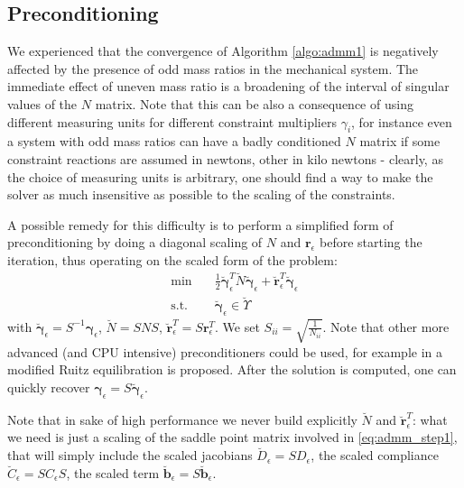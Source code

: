 \documentclass[final,3p]{elsarticle}
\newcommand{\vect}[1]{\bm{#1}}
\begin{document}
\subsection{Preconditioning}

We experienced that the convergence of Algorithm \ref{algo:admm1} is negatively affected by the presence of odd mass ratios in the mechanical system. The immediate effect of uneven mass ratio is a broadening of the interval of singular values of the $N$ matrix. Note that this can be also a consequence of using different measuring units for different constraint multipliers $\gamma_i$, for instance even a system with odd mass ratios can have a badly conditioned $N$ matrix if some constraint reactions are assumed in newtons, other in kilo newtons - clearly, as the choice of measuring units is arbitrary, one should find a way to make the solver as much insensitive as possible to the scaling of the constraints. 

A possible remedy for this difficulty is to perform a simplified form of preconditioning by doing a diagonal scaling of $N$ and $\vect{r}_\epsilon$ before starting the iteration, thus operating on the scaled form of the problem:
%
\begin{align}
	\text{min} \quad & \frac{1}{2} \breve{\vect{\gamma}}_\epsilon^T \breve{N} \breve{\vect{\gamma}}_\epsilon + \breve{\vect{r}}^T_\epsilon \breve{\vect{\gamma}}_\epsilon \\
	\text{s.t.} \quad & \breve{\vect{\gamma}}_\epsilon \in \breve{\Upsilon} 
	\label{eq:ChronoCCP_min_scaled}
\end{align}
%
with $\breve{\vect{\gamma}}_\epsilon = S^{-1} \vect{\gamma}_\epsilon$, $\breve{N} = S N S$, 
$\breve{\vect{r}}^T_\epsilon = S \vect{r}^T_\epsilon$. 
We set $S_{ii} = \sqrt{\frac{1}{N_{ii}}}$. 
Note that other more advanced (and CPU intensive) preconditioners could be used, for example in \cite{Stellato2020} a modified Ruitz equilibration is proposed.  
After the solution is computed, one can quickly recover $\vect{\gamma}_\epsilon = S \breve{\vect{\gamma}}_\epsilon$. 

Note that in sake of high performance we never build explicitly $\breve{N}$ and $\breve{\vect{r}}^T_\epsilon$: what we need is just a scaling of the saddle point matrix involved in \eqref{eq:admm_step1}, that will simply include the scaled jacobians
$\breve{D}_\epsilon = S D_\epsilon$, the scaled compliance
$\breve{C}_\epsilon = S C_\epsilon S$,  the scaled term 
$\breve{\vect{b}}_\epsilon = S \breve{\vect{b}}_\epsilon$.
\end{document}
